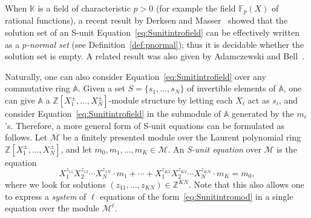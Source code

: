 \documentclass[letterpaper, 11pt, thm-restate]{article}
\numberwithin{equation}{section}
\newcommand{\Z}{\mathbb{Z}}
\newcommand{\K}{\mathbb{K}}
\newcommand{\F}{\mathbb{F}}
\newcommand{\A}{\mathbb{A}}
\newcommand{\mM}{\mathcal{M}}
\theoremstyle{definition}
\theoremstyle{definition}
\theoremstyle{definition}
\begin{document}
When $\K$ is a field of characteristic $p > 0$ (for example the field $\F_p(X)$ of rational functions), a recent result by Derksen and Masser~\cite{derksen2012linear} showed that the solution set of an S-unit Equation~\eqref{eq:Sunitintrofield} can be effectively written as a \emph{$p$-normal set} (see Definition~\ref{def:pnormal}); thus it is decidable whether the solution set is empty.
A related result was also given by Adamczewski and Bell~\cite{adamczewski2012vanishing}.

Naturally, one can also consider Equation~\eqref{eq:Sunitintrofield} over any commutative ring $\A$.
Given a set $S = \{s_1, \ldots, s_N\}$ of invertible elements of $\A$, one can give $\A$ a $\Z[X_1^{\pm}, \ldots, X_N^{\pm}]$-module structure by letting each $X_i$ act as $s_i$, and consider Equation~\eqref{eq:Sunitintrofield} in the submodule of $\A$ generated by the $m_i$'s.
Therefore, a more general form of S-unit equations can be formulated as follows.
Let $\mM$ be a finitely presented module over the Laurent polynomial ring $\Z[X_1^{\pm}, \ldots, X_N^{\pm}]$, and let $m_0, m_1, \ldots, m_K \in \mM$.
An \emph{S-unit equation} over $\mM$ is the equation
    \begin{equation}\label{eq:Sunitintromod}
        X_1^{z_{11}} X_2^{z_{12}} \cdots X_N^{z_{1N}} \cdot m_1 + \cdots + X_1^{z_{K1}} X_2^{z_{K2}} \cdots X_N^{z_{KN}} \cdot m_K = m_0,
    \end{equation}
where we look for solutions $(z_{11}, \ldots, z_{KN}) \in \Z^{KN}$.
Note that this also allows one to express a \emph{system} of $\ell$ equations of the form~\eqref{eq:Sunitintromod} in a single equation over the module $\mM^{\ell}$.
\end{document}
